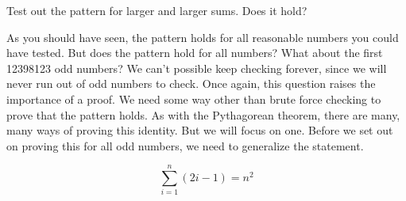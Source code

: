 \begin{exercise}
    Test out the pattern for larger and larger sums. Does it hold?
\end{exercise}

As you should have seen, the pattern holds for all reasonable numbers you could have tested. But does the pattern hold for all numbers? What about the first 12398123 odd numbers? We can't possible keep checking forever, since we will never run out of odd numbers to check. Once again, this question raises the importance of a proof. We need some way other than brute force checking to prove that the pattern holds. As with the Pythagorean theorem, there are many, many ways of proving this identity. But we will focus on one. Before we set out on proving this for all odd numbers, we need to generalize the statement. 
\begin{example}
    \[\sum_{i=1}^{n}{(2i-1)} = n^2\]
\end{example}


